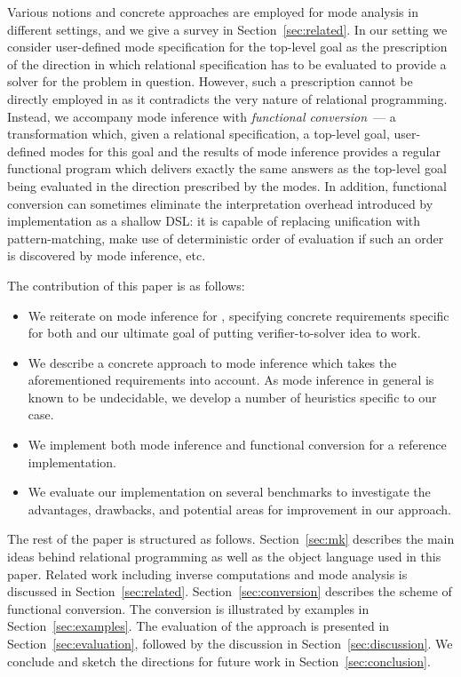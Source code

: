 Various notions and concrete approaches are employed for mode analysis in different settings, and we give a survey in Section~\ref{sec:related}.
In our setting we consider user-defined mode specification for the top-level goal as the prescription of the direction in which relational specification has to be evaluated to provide a solver for the problem in question.
However, such a prescription cannot be directly employed in \mk as it contradicts the very nature of relational programming.
Instead, we accompany mode inference with \emph{functional conversion}~--- a transformation which, given a relational specification, a top-level goal, user-defined modes for this goal and the results of mode inference provides a regular functional program which delivers exactly the same answers as the top-level goal being evaluated in the direction prescribed by the modes.
In addition, functional conversion can sometimes eliminate the interpretation overhead introduced by \mk implementation as a shallow DSL: it is capable of replacing unification with pattern-matching, make use of deterministic order of evaluation if such an order is discovered by mode inference, etc.

The contribution of this paper is as follows:

\begin{itemize}
\item We reiterate on mode inference for \mk, specifying concrete requirements specific for both \mk and our ultimate goal of putting verifier-to-solver idea to work.
\item We describe a concrete approach to mode inference which takes the aforementioned requirements into account. As mode inference in general is known to be undecidable, we develop a number of heuristics specific to our case.
\item We implement both mode inference and functional conversion for a reference \mk implementation.
\item We evaluate our implementation on several benchmarks to investigate the advantages, drawbacks, and potential areas for improvement in our approach.
\end{itemize}

The rest of the paper is structured as follows.
Section~\ref{sec:mk} describes the main ideas behind relational programming as well as the object language used in this paper.
Related work including inverse computations and mode analysis is discussed in Section~\ref{sec:related}.
Section~\ref{sec:conversion} describes the scheme of functional conversion.
The conversion is illustrated by examples in Section~\ref{sec:examples}.
The evaluation of the approach is presented in Section~\ref{sec:evaluation}, followed by the discussion in Section~\ref{sec:discussion}.
We conclude and sketch the directions for future work in Section~\ref{sec:conclusion}.
